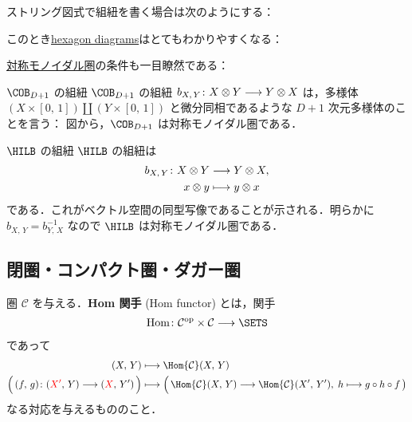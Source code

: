\documentclass[TQFT_main]{subfiles}
\begin{document}
ストリング図式で組紐を書く場合は次のようにする：

このとき\hyperref[def:braided-monoidal]{hexagon diagrams}はとてもわかりやすくなる：

\hyperref[def:braided-monoidal]{対称モノイダル圏}の条件も一目瞭然である：


\begin{myexample}[label=ex:Cob-braided]{$\COB_{D+1}$ の組紐}
    $\COB_{D+1}$ の組紐 $b_{X,\, Y} \colon X \otimes Y \longrightarrow Y \otimes X$ は，多様体 $(X \times [0,\, 1]) \amalg (Y \times [0,\, 1])$ と微分同相であるような $D+1$ 次元多様体のことを言う：
    図から，$\COB_{D+1}$ は対称モノイダル圏である．
\end{myexample}

\begin{myexample}[label=ex:Hilb-braided]{$\HILB$ の組紐}
    $\HILB$ の組紐は
    \begin{align}
        b_{X,\, Y} \colon X \otimes Y &\longrightarrow Y \otimes X, \\
        x \otimes y &\longmapsto y \otimes x
    \end{align}
    である．これがベクトル空間の同型写像であることが示される．明らかに $b_{X,\, Y} = b_{Y,\, X}^{-1}$ なので $\HILB$ は対称モノイダル圏である．
\end{myexample}

\subsection{閉圏・コンパクト圏・ダガー圏}

圏 $\mathcal{C}$ を与える．\textbf{Hom 関手} (Hom functor) とは，関手
\begin{align}
    \mathrm{Hom}{} \colon \mathcal{C}^{\mathrm{op}} \times \mathcal{C} \lto \SETS
\end{align}
であって
\begin{align}
    (X,\, Y) &\lmto \Hom{\mathcal{C}} (X,\, Y) \\
    \Bigl(\, (f,\, g) \colon (\textcolor{red}{X'},\, Y) \lto (\textcolor{red}{X},\, Y')\, \Bigr)  &\lmto \Bigl(\, \Hom{\mathcal{C}}(X,\, Y) \lto \Hom{\mathcal{C}}(X',\, Y'),\; h \lmto g \circ h \circ f \,\bigr) 
\end{align}
なる対応を与えるもののこと．
\end{document}
